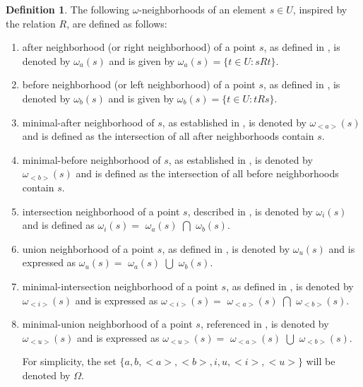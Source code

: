 \documentclass{article}
\theoremstyle{theorem}
\theoremstyle{definition}
\newtheorem{definition}{Definition}[section]
\theoremstyle{remark}
\begin{document}
\begin{definition} \label{d2} The following $\omega$-neighborhoods of an element $s \in U$, inspired by the relation $R$, are
defined as follows:
\begin{enumerate}
\item  after neighborhood (or right neighborhood) of a point $s$, as defined in \cite{Yao 1998,DeBaets1993}, is denoted by $\omega_{a}(s)$ and is given by $\omega_{a}(s) = \{t \in U : sRt\}$.
\item before neighborhood (or left neighborhood) of a point $s$, as defined in \cite{Yao 1998,DeBaets1993}, is denoted by $\omega_{b}(s)$ and is given by $\omega_{b}(s) = \{t \in U : tRs\}$.
\item  minimal-after neighborhood of $s$, as established in \cite{Allam2005}, is denoted by $\omega_{<a>}(s)$ and  is  defined as the intersection of all after neighborhoods contain $s$.
\item  minimal-before neighborhood of $s$, as established in \cite{Allam2005, Allam2006}, is denoted by $\omega_{<b>}(s)$  and  is  defined as  the intersection of all before neighborhoods contain $s$.
\item  intersection neighborhood of a point $s$, described in \cite{Yao 1998,Abd El-Monsef 2014}, is denoted by $\omega_{i}(s)$ and is defined as $\omega_{i}(s) =$ $\omega_{a}(s)$ $\bigcap$ $\omega_{b}(s)$.
\item union neighborhood of a point $s$, as defined in \cite{Yao 1998,Abd El-Monsef 2014}, is denoted by $\omega_{u}(s)$ and is expressed as $\omega_{u}(s) = $ $\omega_{a}(s)$ $\bigcup$ $\omega_{b}(s)$.
\item  minimal-intersection neighborhood of a point $s$, as defined in \cite{Abd El-Monsef 2014,Kozae 2010}, is denoted by $\omega_{<i>}(s)$ and is expressed as $\omega_{<i>}(s) =$ $\omega_{<a>}(s)$ $\bigcap$ $\omega_{<b>}(s)$.
\item  minimal-union neighborhood of a point $s$, referenced in \cite{Abd El-Monsef 2014}, is denoted by $\omega_{<u>}(s)$ and is expressed as  $\omega_{<u>}(s) = $ $\omega_{<a>}(s)$ $\bigcup$ $\omega_{<b>}(s)$. \newline

For simplicity, the set $\{a, b, <a>, <b>, i, u, <i>, <u>\}$ will be denoted by $\Omega$.

\end{enumerate}
\end{definition}
\end{document}
